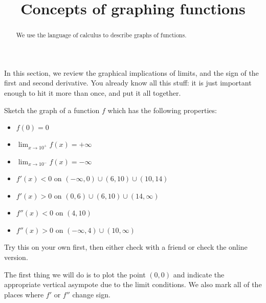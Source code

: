 \documentclass{ximera}
\title[Dig-In:]{Concepts of graphing functions}
\begin{document}
\begin{abstract}
  We use the language of calculus to describe graphs of functions.
\end{abstract}
\maketitle

In this section, we review the graphical implications of limits, and
the sign of the first and second derivative.  You already know all
this stuff: it is just important enough to hit it more than once, and
put it all together.

\begin{example}
  Sketch the graph of a function $f$ which has the following properties:
  \begin{itemize}
  \item $f(0)=0$
  \item $\displaystyle\lim_{x \to 10^+} f(x) = +\infty$
  \item $\displaystyle\lim_{x \to 10^-} f(x) = -\infty$
  \item $f'(x)<0$ on $(-\infty,0) \cup (6,10) \cup (10,14)$
  \item $f'(x)>0$ on $(0,6) \cup (6,10) \cup (14,\infty)$
  \item $f''(x)<0$ on $(4,10)$
  \item $f''(x)>0$ on $(-\infty,4) \cup (10,\infty)$
  \end{itemize}
  \begin{explanation}
    Try this on your own first, then either check with a friend or
    check the online version.
    
    \begin{hint}
      The first thing we will do is to plot the point $(0,0)$ and
      indicate the appropriate vertical asympote due to the limit
      conditions.  We also mark all of the places where $f'$ or $f''$
      change sign.
      

\end{hint}
\end{explanation}
\end{example}
\end{document}
